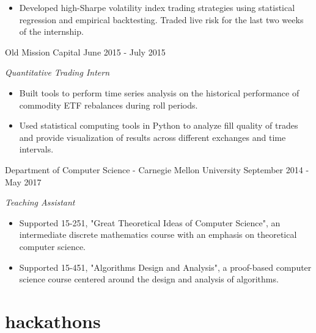 \documentclass[print]{friggeri-cv} %
\begin{document}
\begin{entrylist}
{\begin{itemize}
\item Developed high-Sharpe volatility index trading strategies using statistical regression and empirical backtesting. Traded live risk for the last two weeks of the internship. 
\end{itemize}}
\entry
{Old Mission Capital}
{June 2015 - July 2015}
{\emph{Quantitative Trading Intern}
\begin{itemize}
\item Built tools to perform time series analysis on the historical performance of commodity ETF rebalances during roll periods. 
\item Used statistical computing tools in Python to analyze fill quality of trades and provide visualization of results across different exchanges and time intervals.
\end{itemize}}
\entry
{Department of Computer Science - Carnegie Mellon University}
{September 2014 - May 2017}
{\emph{Teaching Assistant}
\begin{itemize}
\item Supported 15-251,  "Great Theoretical Ideas of Computer Science", an intermediate discrete mathematics course with an emphasis on theoretical computer science.
\item Supported 15-451, "Algorithms Design and Analysis", a proof-based computer science course centered around the design and analysis of algorithms.
\end{itemize}}

\end{entrylist}


\section{hackathons}
\end{document}
